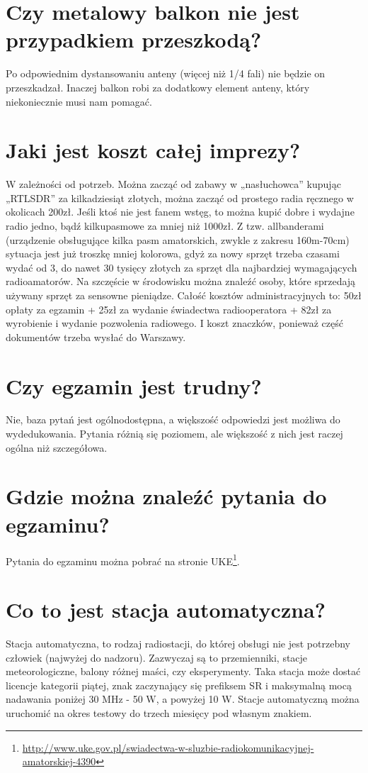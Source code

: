 \documentclass[a4paper,12pt]{article}
\begin{document}
\section{Czy metalowy balkon nie jest przypadkiem przeszkodą?}
Po odpowiednim dystansowaniu anteny (więcej niż 1/4 fali) nie będzie on przeszkadzał. Inaczej balkon robi za dodatkowy element anteny, który niekoniecznie musi nam pomagać.

\section{Jaki jest koszt całej imprezy?}
W zależności od potrzeb. Można zacząć od zabawy w „nasłuchowca” kupując „RTLSDR” za kilkadziesiąt złotych, można zacząć od prostego radia ręcznego w okolicach 200zł. Jeśli ktoś nie jest fanem wstęg, to można kupić dobre i wydajne radio jedno, bądź kilkupasmowe za mniej niż 1000zł. Z tzw. allbanderami (urządzenie obsługujące kilka pasm amatorskich, zwykle z zakresu 160m-70cm) sytuacja jest już troszkę mniej kolorowa, gdyż za nowy sprzęt trzeba czasami wydać od 3, do nawet 30 tysięcy złotych za sprzęt dla najbardziej wymagających radioamatorów. Na szczęście w środowisku można znaleźć osoby, które sprzedają używany sprzęt za sensowne pieniądze.
Całość kosztów administracyjnych to: 50zł opłaty za egzamin + 25zł za wydanie świadectwa radiooperatora + 82zł za wyrobienie i wydanie pozwolenia radiowego. I koszt znaczków, ponieważ część dokumentów trzeba wysłać do Warszawy.

\section{Czy egzamin jest trudny?}
Nie, baza pytań jest ogólnodostępna, a większość odpowiedzi jest możliwa do wydedukowania. Pytania różnią się poziomem, ale większość z nich jest raczej ogólna niż szczegółowa.

\section{Gdzie można znaleźć pytania do egzaminu?}
Pytania do egzaminu można pobrać na stronie UKE\footnote{\url{http://www.uke.gov.pl/swiadectwa-w-sluzbie-radiokomunikacyjnej-amatorskiej-4390}}.

\section{Co to jest stacja automatyczna?}
Stacja automatyczna, to rodzaj radiostacji, do której obsługi nie jest potrzebny człowiek (najwyżej do nadzoru). Zazwyczaj są to przemienniki, stacje meteorologiczne, balony różnej maści, czy eksperymenty. Taka stacja może dostać licencje kategorii piątej, znak zaczynający się prefiksem SR i maksymalną mocą nadawania poniżej 30 MHz - 50 W, a powyżej 10 W.
Stacje automatyczną można uruchomić na okres testowy do trzech miesięcy pod własnym znakiem.
\end{document}
